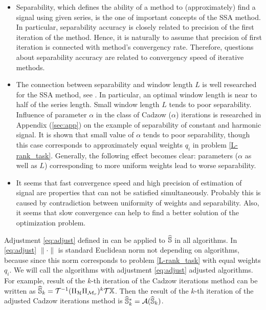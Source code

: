 \documentclass[12pt,a4paper,fleqn,leqno]{article}
\begin{document}
\begin{itemize}
\item
Separability, which defines the ability of a method to (approximately) find a signal using given series, is the one of important concepts of the SSA method. In particular, separability accuracy is closely related to precision of the first iteration of the method. Hence, it is naturally to assume that precision of first iteration is connected with method's convergency rate. Therefore, questions about separability accuracy are related to convergency speed of iterative methods.
\item
The connection between separability and window length $L$ is well researched for the SSA method, see \cite{Golyandina2010}. In particular, an optimal window length is near to half of the series length. Small window length $L$ tends to poor separability. Influence of parameter $\alpha$ in the class of Cadzow ($\alpha$) iterations is researched in Appendix (\ref{sec:app}) on the example of separability of constant and harmonic signal. It is shown that small value of $\alpha$ tends to poor separability, though this case corresponds to approximately equal weights $q_i$ in problem \eqref{L-rank_task}. Generally, the following effect becomes clear: parameters ($\alpha$ as well as $L$) corresponding to more uniform weights lead to worse separability.
\item
It seems that fast convergence speed and high precision of estimation of signal are properties that can not be satisfied simultaneously. Probably this is caused by contradiction between uniformity of weights and separability. Also, it seems that slow convergence can help to find a better solution of the optimization problem.
\end{itemize}

\begin{remark}
\label{rem:adjust}
Adjustment \eqref{eq:adjust} defined in can be applied to $\widehat{\mathbb{S}}$ in all algorithms. In \eqref{eq:adjust} $\|\cdot\|$ is standard Euclidean norm not depending on algorithms, because since this norm corresponds to problem \eqref{L-rank_task} with equal weights $q_i$. We will call the algorithms with adjustment \eqref{eq:adjust} adjusted algorithms. For example, result of the $k$-th iteration of the Cadzow iterations method can be written as $\widehat{\mathbb{S}}_k = \mathcal{T}^{-1}(\Pi_{\mathcal{H}} \Pi_{\mathcal{M}_r})^k \mathcal{T} \mathbb{X}$. Then the result of the $k$-th iteration of the adjusted Cadzow iterations method is $\widehat{\mathbb{S}}_k^*=\mathcal{A}(\widehat{\mathbb{S}}_k)$.
\end{remark}
\end{document}
